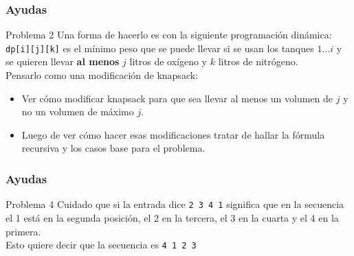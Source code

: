 \documentclass{beamer}
\begin{document}
	
	
	\begin{frame}[fragile]
		\frametitle{Ayudas}
		\begin{block}{Problema 2}
			Una forma de hacerlo es con la siguiente programación dinámica:\\
			\verb|dp[i][j][k]| es el mínimo peso que se puede llevar si se usan los tanques $1 \ldots i$ y se quieren llevar \textbf{al menos} $j$ litros de oxígeno y $k$ litros de nitrógeno.\\
			Pensarlo como una modificación de knapsack:\\
			\begin{itemize}
				\item Ver cómo modificar knapsack para que sea llevar al menos un volumen de $j$ y no un volumen de máximo $j$.
				\item Luego de ver cómo hacer esas modificaciones tratar de hallar la fórmula recursiva y los casos base para el problema.
			\end{itemize}
		\end{block}
	\end{frame}
	
	\begin{frame}[fragile]
		\frametitle{Ayudas}
		\begin{block}{Problema 4}
			Cuidado que si la entrada dice \verb|2 3 4 1| significa que en la secuencia el 1 está en la segunda posición, el 2 en la tercera, el 3 en la cuarta y el 4 en la primera.\\
			Esto quiere decir que la secuencia es \verb|4 1 2 3|
		\end{block}
	\end{frame}
	
\end{document}
